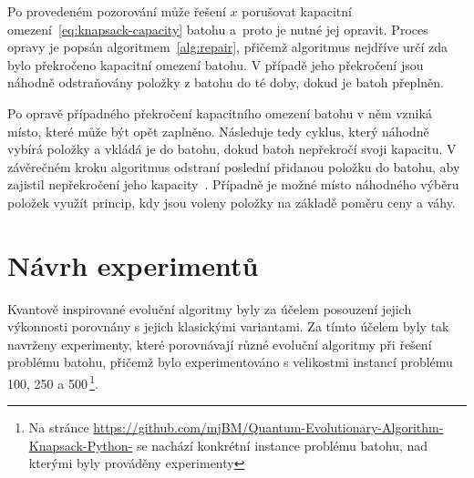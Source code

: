 Po provedeném pozorování může řešení $x$ porušovat kapacitní omezení~\ref{eq:knapsack-capacity} batohu a~proto je nutné jej opravit. 
Proces opravy je popsán algoritmem~\ref{alg:repair}, přičemž algoritmus nejdříve určí zda bylo překročeno kapacitní omezení batohu. 
V případě jeho překročení jsou náhodně odstraňovány položky z batohu do té doby, dokud je batoh přeplněn. 

Po opravě případného překročení kapacitního omezení batohu v něm vzniká místo, které může být opět zaplněno. 
Následuje tedy cyklus, který náhodně vybírá položky a vkládá je do batohu, dokud batoh nepřekročí svoji kapacitu. 
V závěrečném kroku algoritmus odstraní poslední přidanou položku do batohu, aby zajistil nepřekročení jeho kapacity~\cite{qiga}.
Případně je možné místo náhodného výběru položek využít princip, kdy jsou voleny položky na základě poměru ceny a váhy. 

\section{Návrh experimentů}\label{sec:experiments-design}
Kvantově inspirované evoluční algoritmy byly za účelem posouzení jejich výkonnosti porovnány s jejich klasickými variantami. 
Za tímto účelem byly tak navrženy experimenty, které porovnávají různé evoluční algoritmy při řešení problému batohu, přičemž bylo experimentováno s velikostmi instancí problému 100, 250 a 500\,\footnote{Na stránce \url{https://github.com/mjBM/Quantum-Evolutionary-Algorithm-Knapsack-Python-} se nachází konkrétní instance problému batohu, nad kterými byly prováděny experimenty}. 

